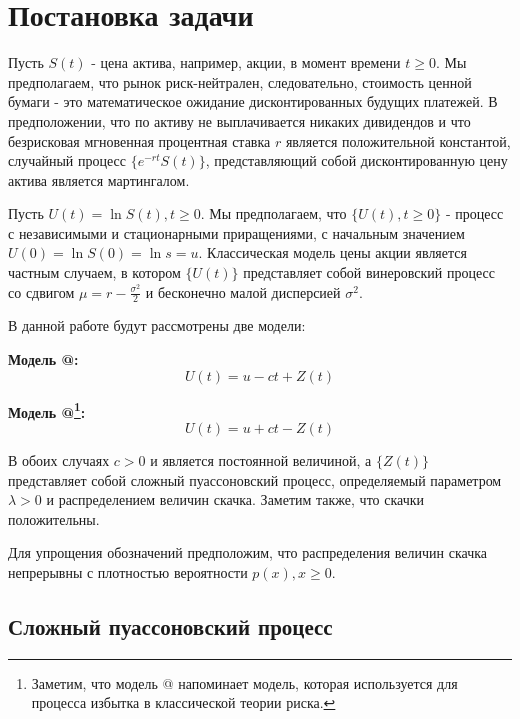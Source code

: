 \documentclass[a4paper,12pt]{article}
\makeatletter
\theoremstyle{definition}
\newcommand*{\rom}[1]{\expandafter\@slowromancap\romannumeral #1@}
\makeatother
\begin{document}

\section{Постановка задачи}

Пусть $S(t)$ - цена актива, например, акции, в момент времени $t \ge 0$. Мы предполагаем, что рынок риск-нейтрален, следовательно, стоимость ценной бумаги - это математическое ожидание дисконтированных будущих платежей. В предположении, что по активу не выплачивается никаких дивидендов и что безрисковая мгновенная процентная ставка $r$ является положительной константой, случайный процесс $\{e^{-rt} S(t)\}$, представляющий собой дисконтированную цену актива  является мартингалом.

Пусть $U(t) = \ln{S(t)}, t \ge 0$. Мы предполагаем, что $\{U(t), t \ge 0\}$ - процесс с независимыми и стационарными приращениями, с начальным значением $U(0) = \ln{S(0)} = \ln{s} = u$. Классическая модель цены акции является частным случаем, в котором $\{U(t)\}$ представляет собой винеровский процесс со сдвигом $\mu = r - \frac{\sigma ^ {2}}{2}$ и бесконечно малой дисперсией $\sigma ^ {2}$. 

\newpage

В данной работе будут рассмотрены две модели:

\textbf{Модель \rom{1}:}
\begin{equation}\label{eq:model1_definition}
    U(t) = u - ct + Z(t)
\end{equation}

\textbf{Модель \rom{2}\footnote{Заметим, что модель \rom{2} напоминает модель, которая используется для процесса избытка в классической теории риска.}:} 
\begin{equation}\label{eq:model2_definition}
    U(t) = u + ct - Z(t)
\end{equation}

В обоих случаях $c > 0$ и является постоянной величиной, а $\{Z(t)\}$ представляет собой сложный пуассоновский процесс, определяемый параметром $\lambda > 0$ и распределением величин скачка. Заметим также, что скачки положительны.

\label{sec:positivityOfJumsAssumption} Для упрощения обозначений предположим, что распределения величин скачка
непрерывны с плотностью вероятности $p(x), x \ge 0$. 

\subsection{Сложный пуассоновский процесс}
\end{document}
